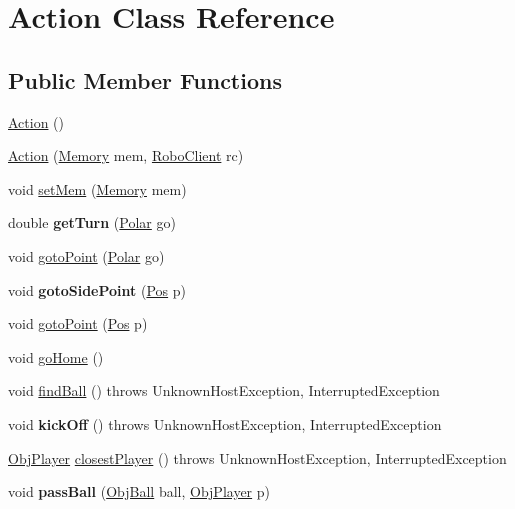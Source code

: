 \hypertarget{classAction}{
\section{Action Class Reference}
\label{classAction}
}
\subsection*{Public Member Functions}
\begin{DoxyCompactItemize}
\item 
\hyperlink{classAction_a4f457ccfc8336b565cadca56b36e0271}{Action} ()
\item 
\hyperlink{classAction_acfa1602ef29e16a6047cc058ff0a16ac}{Action} (\hyperlink{classMemory}{Memory} mem, \hyperlink{classRoboClient}{RoboClient} rc)
\item 
void \hyperlink{classAction_a4f775977b788d1379b9f6c45bb37c01f}{setMem} (\hyperlink{classMemory}{Memory} mem)
\item 
\hypertarget{classAction_ad68c5200162e4023fb88488e340ea454}{
double {\bfseries getTurn} (\hyperlink{classPolar}{Polar} go)}
\label{classAction_ad68c5200162e4023fb88488e340ea454}

\item 
void \hyperlink{classAction_a6b7099c20c56fc3dd72ce4c8ba4f3870}{gotoPoint} (\hyperlink{classPolar}{Polar} go)
\item 
\hypertarget{classAction_a653bde47fe3bd4263ed31095e2ee1cfc}{
void {\bfseries gotoSidePoint} (\hyperlink{classPos}{Pos} p)}
\label{classAction_a653bde47fe3bd4263ed31095e2ee1cfc}

\item 
void \hyperlink{classAction_a5f7eb7be5b6b18854936367833044a6e}{gotoPoint} (\hyperlink{classPos}{Pos} p)
\item 
void \hyperlink{classAction_abf9085a62947a12cc2e154396177ec90}{goHome} ()
\item 
void \hyperlink{classAction_a49e1c7f1d7f5a4294c93833997603339}{findBall} ()  throws UnknownHostException, InterruptedException 
\item 
\hypertarget{classAction_a79224f655b7f92fe9a334bf96a01e844}{
void {\bfseries kickOff} ()  throws UnknownHostException, InterruptedException }
\label{classAction_a79224f655b7f92fe9a334bf96a01e844}

\item 
\hyperlink{classObjPlayer}{ObjPlayer} \hyperlink{classAction_a63d035f7132842d9720b88247d525112}{closestPlayer} ()  throws UnknownHostException, InterruptedException 
\item 
\hypertarget{classAction_a55e146013466e96013a196d9bd787410}{
void {\bfseries passBall} (\hyperlink{classObjBall}{ObjBall} ball, \hyperlink{classObjPlayer}{ObjPlayer} p)}
\label{classAction_a55e146013466e96013a196d9bd787410}


\end{DoxyCompactItemize}
